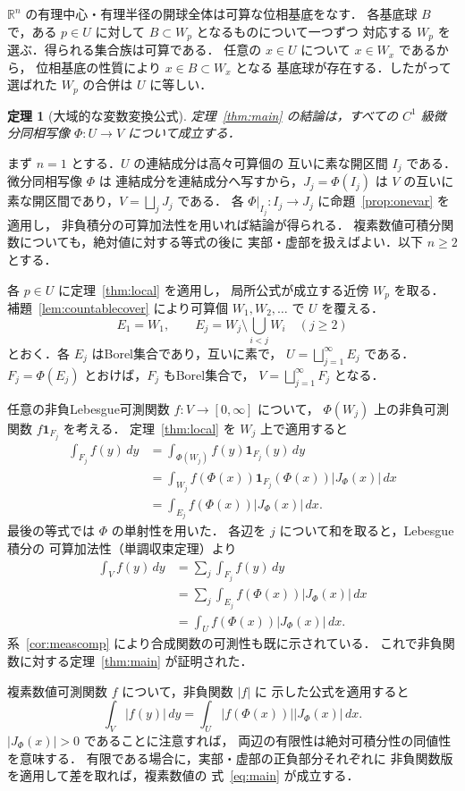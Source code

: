 \documentclass[a5paper,10pt,onecolumn]{jsarticle}
\makeatletter
\theoremstyle{mathnotetheorem}
\newtheorem{theorem}{定理}[section]
\renewcommand{\proofname}{証明}
\renewenvironment{proof}[1][\proofname]{%
  \par\pushQED{\qed}\normalfont\topsep4\p@\@plus2\p@\relax
  \trivlist\item[\hskip\labelsep\bfseries #1]\ignorespaces
}{\popQED\endtrivlist\@endpefalse}
\newcommand{\R}{\mathbb{R}}
\newcommand{\abs}[1]{\lvert #1\rvert}
\makeatother
\begin{document}
\begin{proof}
$\R^n$ の有理中心・有理半径の開球全体は可算な位相基底をなす．
各基底球 $B$ で，ある $p\in U$ に対して
$B\subset W_p$ となるものについて一つずつ
対応する $W_p$ を選ぶ．得られる集合族は可算である．
任意の $x\in U$ について $x\in W_x$ であるから，
位相基底の性質により $x\in B\subset W_x$ となる
基底球が存在する．したがって選ばれた $W_p$ の合併は $U$ に等しい．
\end{proof}

\begin{theorem}[大域的な変数変換公式]\label{thm:global}
定理~\ref{thm:main} の結論は，すべての
$C^1$ 級微分同相写像 $\Phi:U\to V$ について成立する．
\end{theorem}

\begin{proof}
まず $n=1$ とする．$U$ の連結成分は高々可算個の
互いに素な開区間 $I_j$ である．微分同相写像 $\Phi$ は
連結成分を連結成分へ写すから，$J_j=\Phi(I_j)$ は
$V$ の互いに素な開区間であり，$V=\bigsqcup_j J_j$ である．
各 $\Phi|_{I_j}:I_j\to J_j$ に命題~\ref{prop:onevar} を適用し，
非負積分の可算加法性を用いれば結論が得られる．
複素数値可積分関数についても，絶対値に対する等式の後に
実部・虚部を扱えばよい．以下 $n\ge2$ とする．

各 $p\in U$ に定理~\ref{thm:local} を適用し，
局所公式が成立する近傍 $W_p$ を取る．
補題~\ref{lem:countablecover} により可算個
$W_1,W_2,\ldots$ で $U$ を覆える．
\[
 E_1=W_1,\qquad
 E_j=W_j\setminus\bigcup_{i<j}W_i\quad(j\ge2)
\]
とおく．各 $E_j$ はBorel集合であり，互いに素で，
$U=\bigsqcup_{j=1}^{\infty}E_j$ である．
$F_j=\Phi(E_j)$ とおけば，$F_j$ もBorel集合で，
$V=\bigsqcup_{j=1}^{\infty}F_j$ となる．

任意の非負Lebesgue可測関数 $f:V\to[0,\infty]$ について，
$\Phi(W_j)$ 上の非負可測関数 $f\mathbf1_{F_j}$ を考える．
定理~\ref{thm:local} を $W_j$ 上で適用すると
\begin{align*}
 \int_{F_j}f(y)\,dy
 &=\int_{\Phi(W_j)}f(y)\mathbf1_{F_j}(y)\,dy\\
 &=\int_{W_j}f(\Phi(x))
  \mathbf1_{F_j}(\Phi(x))\abs{J_\Phi(x)}\,dx\\
 &=\int_{E_j}f(\Phi(x))\abs{J_\Phi(x)}\,dx.
\end{align*}
最後の等式では $\Phi$ の単射性を用いた．
各辺を $j$ について和を取ると，Lebesgue積分の
可算加法性（単調収束定理）より
\begin{align*}
 \int_V f(y)\,dy
 &=\sum_j\int_{F_j}f(y)\,dy\\
 &=\sum_j\int_{E_j}f(\Phi(x))\abs{J_\Phi(x)}\,dx\\
 &=\int_U f(\Phi(x))\abs{J_\Phi(x)}\,dx.
\end{align*}
系~\ref{cor:meascomp} により合成関数の可測性も既に示されている．
これで非負関数に対する定理~\ref{thm:main} が証明された．

複素数値可測関数 $f$ について，非負関数 $\abs f$ に
示した公式を適用すると
\[
 \int_V\abs{f(y)}\,dy
 =\int_U\abs{f(\Phi(x))}\abs{J_\Phi(x)}\,dx.
\]
$\abs{J_\Phi(x)}>0$ であることに注意すれば，
両辺の有限性は絶対可積分性の同値性を意味する．
有限である場合に，実部・虚部の正負部分それぞれに
非負関数版を適用して差を取れば，複素数値の
式~\eqref{eq:main} が成立する．
\end{proof}
\end{document}
